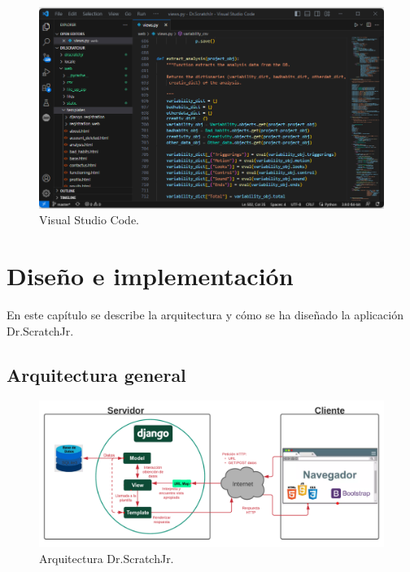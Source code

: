 \documentclass[a4paper, 12pt]{book}
\begin{document}
\begin{figure}[ht]
  \centering
  \includegraphics[width=16cm, keepaspectratio]{img/visualstudiocode.png}
  \caption{Visual Studio Code.}\label{fig:visualstudiocode}
\end{figure}



\cleardoublepage
\chapter{Diseño e implementación}
\label{chap:implementacion}

En este capítulo se describe la arquitectura y cómo se ha diseñado la aplicación Dr.ScratchJr.

\section{Arquitectura general} 
\label{sec:arquitectura}

\begin{figure}[h!]
  \centering
  \includegraphics[width=16cm, keepaspectratio]{img/arquitectura.png}
  \caption{Arquitectura Dr.ScratchJr.}\label{fig:arquitectura}
\end{figure}
\end{document}
